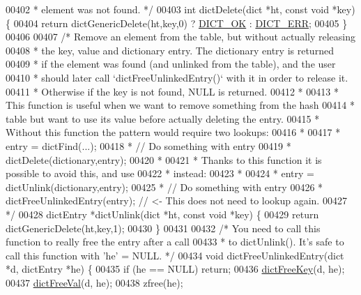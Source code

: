 \begin{DoxyCode}
00402 \textcolor{comment}{ * element was not found. */}
00403 \textcolor{keywordtype}{int} dictDelete(dict *ht, \textcolor{keyword}{const} \textcolor{keywordtype}{void} *key) \{
00404     \textcolor{keywordflow}{return} dictGenericDelete(ht,key,0) ? \hyperlink{dict_8h_a2afecbeab8f7efbc183048f52f6d17e5}{DICT\_OK} : \hyperlink{dict_8h_a6ce31f31f044b1570d335e8fa0c388c6}{DICT\_ERR};
00405 \}
00406 
00407 \textcolor{comment}{/* Remove an element from the table, but without actually releasing}
00408 \textcolor{comment}{ * the key, value and dictionary entry. The dictionary entry is returned}
00409 \textcolor{comment}{ * if the element was found (and unlinked from the table), and the user}
00410 \textcolor{comment}{ * should later call `dictFreeUnlinkedEntry()` with it in order to release it.}
00411 \textcolor{comment}{ * Otherwise if the key is not found, NULL is returned.}
00412 \textcolor{comment}{ *}
00413 \textcolor{comment}{ * This function is useful when we want to remove something from the hash}
00414 \textcolor{comment}{ * table but want to use its value before actually deleting the entry.}
00415 \textcolor{comment}{ * Without this function the pattern would require two lookups:}
00416 \textcolor{comment}{ *}
00417 \textcolor{comment}{ *  entry = dictFind(...);}
00418 \textcolor{comment}{ *  // Do something with entry}
00419 \textcolor{comment}{ *  dictDelete(dictionary,entry);}
00420 \textcolor{comment}{ *}
00421 \textcolor{comment}{ * Thanks to this function it is possible to avoid this, and use}
00422 \textcolor{comment}{ * instead:}
00423 \textcolor{comment}{ *}
00424 \textcolor{comment}{ * entry = dictUnlink(dictionary,entry);}
00425 \textcolor{comment}{ * // Do something with entry}
00426 \textcolor{comment}{ * dictFreeUnlinkedEntry(entry); // <- This does not need to lookup again.}
00427 \textcolor{comment}{ */}
00428 dictEntry *dictUnlink(dict *ht, \textcolor{keyword}{const} \textcolor{keywordtype}{void} *key) \{
00429     \textcolor{keywordflow}{return} dictGenericDelete(ht,key,1);
00430 \}
00431 
00432 \textcolor{comment}{/* You need to call this function to really free the entry after a call}
00433 \textcolor{comment}{ * to dictUnlink(). It's safe to call this function with 'he' = NULL. */}
00434 \textcolor{keywordtype}{void} dictFreeUnlinkedEntry(dict *d, dictEntry *he) \{
00435     \textcolor{keywordflow}{if} (he == NULL) \textcolor{keywordflow}{return};
00436     \hyperlink{dict_8h_a29fe9bb2bf0eac2c86a613536afe73ca}{dictFreeKey}(d, he);
00437     \hyperlink{dict_8h_a4a90ee4c2d8391f2d6f9c65ccf4ba037}{dictFreeVal}(d, he);
00438     zfree(he);

\end{DoxyCode}
